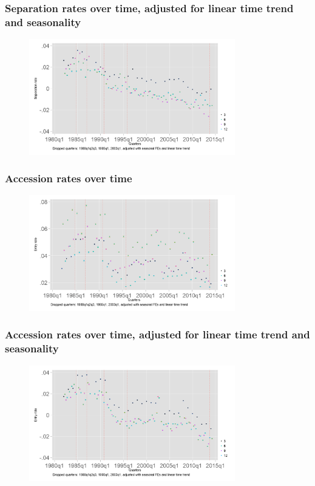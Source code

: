 \documentclass[aspectratio=169]{beamer}
\begin{document}
\begin{frame}
    \frametitle{Separation rates over time, adjusted for linear time trend and seasonality}

    \begin{figure}[]
        \centering
        \includegraphics[width=0.8\textwidth]{../output/separation_rate_adj_CI.png}
    \end{figure}

\end{frame}

\begin{frame}
    \frametitle{Accession rates over time}

    \begin{figure}[]
        \centering
        \includegraphics[width=0.8\textwidth]{../output/accession_rate_CI.png}
    \end{figure}

\end{frame}

\begin{frame}
    \frametitle{Accession rates over time, adjusted for linear time trend and seasonality}

    \begin{figure}[]
        \centering
        \includegraphics[width=0.8\textwidth]{../output/accession_rate_adj_CI.png}
    \end{figure}

\end{frame}
\end{document}
